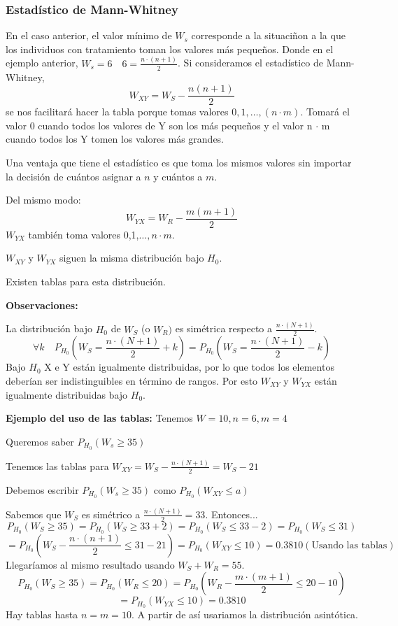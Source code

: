 \subsubsection{Estadístico de Mann-Whitney}

En el caso anterior, el valor mínimo de $W_s$ corresponde a la situaciñon a la que los individuos con tratamiento toman los valores más pequeños. Donde en el ejemplo anterior, $W_s=6 \quad 6=\frac{n \cdot (n+1)}{2}$.
Si consideramos el estadístico de Mann-Whitney,
\[
    W_{XY}=W_S-\frac{n(n+1)}{2}
\]
se nos facilitará hacer la tabla porque tomas valores $0,1,\dots,(n \cdot m)$. Tomará el valor 0 cuando todos los valores de Y son los más pequeños y el valor n $\cdot$ m  cuando todos los Y tomen los valores más grandes.

Una ventaja que tiene el estadístico es que toma los mismos valores sin importar la decisión de cuántos asignar a $n$ y cuántos a $m$.

Del mismo modo:
\[
    W_{YX}=W_R-\frac{m(m+1)}{2}
\]
$W_{YX}$ también toma valores 0,1,$\dots,n \cdot m$.

\noindent $W_{XY}$ y $W_{YX}$ siguen la misma distribución bajo $H_0$.

\noindent Existen tablas para esta distribución.

\vspace{2mm}

\noindent \textbf{Observaciones:}

La distribución bajo $H_0$ de $W_S$ (o $W_R)$ es simétrica respecto a $\frac{n \cdot (N+1)}{2}$.
\[
    \forall k \quad P_{H_0} \left( W_S=\frac{n \cdot (N+1)}{2}+k\right)=
    P_{H_0} \left( W_S=\frac{n \cdot (N+1)}{2}-k\right)
\]
Bajo $H_0$ X e Y están igualmente distribuidas, por lo que todos los elementos deberían ser indistinguibles en término de rangos. Por esto $W_{XY}$ y $W_{YX}$ están igualmente distribuidas bajo $H_0$.

\textbf{Ejemplo del uso de las tablas:}
\noindent Tenemos $W=10,n=6,m=4$

\noindent Queremos saber $P_{H_0}(W_s \geq 35)$

\noindent Tenemos las tablas para $W_{XY}=W_S-\frac{n \cdot (N+1)}{2}=W_S-21$

\noindent Debemos escribir $P_{H_0}(W_s \geq 35)$ como $P_{H_0}(W_{XY} \leq a)$

\noindent Sabemos que $W_S$ es simétrico a $\frac{n \cdot (N+1)}{2}=33$. Entonces...
\[
    P_{H_0}(W_S \geq 35)= P_{H_0}(W_S \geq 33+2)=P_{H_0}(W_S \leq 33-2)=P_{H_0}(W_S \leq 31)
\]
\[
    =P_{H_0}\left(W_S-\frac{n \cdot (n+1)}{2} \leq 31-21\right)= P_{H_0} (W_{XY} \leq 10)=0.3810 (\text{Usando las tablas})
\]
Llegaríamos al mismo resultado usando $W_S+W_R=55$.
\[
    P_{H_0}(W_S \geq 35)= P_{H_0}(W_R \leq 20)= P_{H_0} \left( W_R - \frac{m \cdot (m+1)}{2} \leq 20-10\right)
\]
\[
    = P_{H_0} (W_{YX} \leq 10)=0.3810
\]
Hay tablas hasta $n=m=10$. A partir de así usariamos la distribución asintótica.

